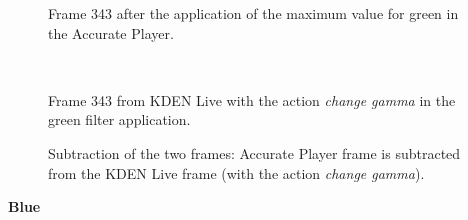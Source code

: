 \documentclass[../MasterThesis.tex]{subfiles}
\begin{document}
\begin{minipage}{0.48\textwidth}
	\begin{figure}[H]
		\begin{center}
			\caption[]{Frame 343 after the application of the maximum value for green in the Accurate Player.}
		\end{center}
	\end{figure}
\end{minipage}\begin{minipage}{0.04\textwidth}
	\ 
\end{minipage}\begin{minipage}{0.48\textwidth}
	\begin{figure}[H]
		\begin{center}
			\caption[]{Frame 343 from KDEN Live with the action \textit{change gamma} in the green filter application.}
		\end{center}
	\end{figure}
\end{minipage}

\vspace*{-1em}

\begin{figure}[H]
	\begin{center}
		\caption[]{Subtraction of the two frames: Accurate Player frame is subtracted from the KDEN Live frame (with the action \textit{change gamma}).}
	\end{center}
\end{figure}







\vspace*{-1em}

\textbf{Blue}

\vspace*{-1em}
\end{document}

